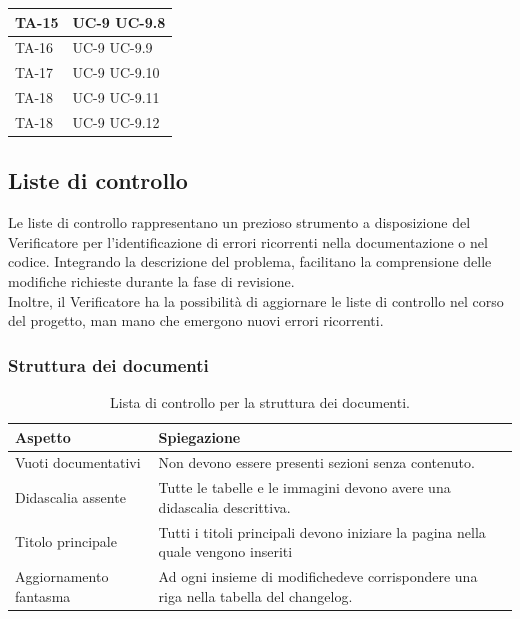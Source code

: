 \documentclass[8pt]{article}
\begin{document}
\begin{longtable}{|>{\centering}p{4cm}|>{\centering\arraybackslash}p{4cm}|}
    \\
    \hline
    TA-15 & UC-9 \newline
            UC-9.8
    \\
    \hline
    TA-16 & UC-9 \newline
            UC-9.9
    \\
    \hline
    TA-17 & UC-9 \newline
            UC-9.10
    \\
    \hline
    TA-18 & UC-9 \newline
            UC-9.11
    \\
    \hline
    TA-18 & UC-9 \newline
            UC-9.12
    \\
    \hline
\end{longtable}
\clearpage
\subsection{Liste di controllo}
Le liste di controllo rappresentano un prezioso strumento a disposizione del
Verificatore per l'identificazione di errori ricorrenti nella documentazione o nel codice. Integrando la descrizione del problema, facilitano la comprensione delle modifiche richieste durante la fase di revisione.
\\
Inoltre, il Verificatore ha la possibilità di aggiornare le liste di controllo nel corso del progetto, man mano che emergono nuovi errori ricorrenti.
\subsubsection{Struttura dei documenti}
\renewcommand{\arraystretch}{2.5}
\begin{longtable}{|>{\centering}p{5cm}|>{\centering\arraybackslash}p{10cm}|}
\hline
\rowcolor{white}
    \textbf{Aspetto} & \textbf{Spiegazione} \\
\hline
\endfirsthead
\rowcolor{white}
\caption{Lista di controllo per la struttura dei documenti.}
\label{table:Lista di controllo per la struttura dei documenti}
\endlastfoot
    Vuoti documentativi & Non devono essere presenti sezioni senza contenuto. \\
\hline
    Didascalia assente & Tutte le tabelle e le immagini devono avere una didascalia descrittiva. \\
\hline    
Titolo principale & Tutti i titoli principali devono iniziare la pagina nella quale vengono
    inseriti \\
\hline
    Aggiornamento fantasma & Ad ogni insieme di modifichedeve corrispondere una riga nella tabella
    del changelog. \\
\hline
\end{longtable}
\end{document}
